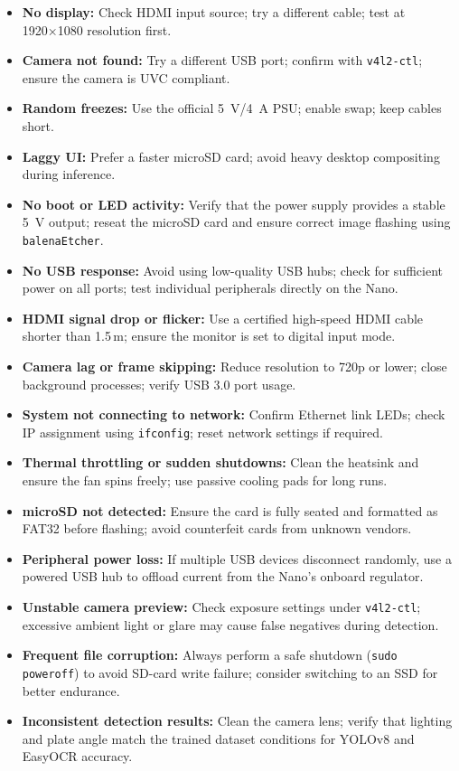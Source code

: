 \begin{itemize}
   \item \textbf{No display:} Check HDMI input source; try a different cable; test at 1920×1080 resolution first.
	\item \textbf{Camera not found:} Try a different USB port; confirm with \texttt{v4l2-ctl}; ensure the camera is UVC compliant.
	\item \textbf{Random freezes:} Use the official \SI{5}{\volt}/\SI{4}{\ampere} PSU; enable swap; keep cables short.
	\item \textbf{Laggy UI:} Prefer a faster microSD card; avoid heavy desktop compositing during inference.
	\item \textbf{No boot or LED activity:} Verify that the power supply provides a stable \SI{5}{\volt} output; reseat the microSD card and ensure correct image flashing using \texttt{balenaEtcher}.
	\item \textbf{No USB response:} Avoid using low-quality USB hubs; check for sufficient power on all ports; test individual peripherals directly on the Nano.
	\item \textbf{HDMI signal drop or flicker:} Use a certified high-speed HDMI cable shorter than 1.5\,m; ensure the monitor is set to digital input mode.
	\item \textbf{Camera lag or frame skipping:} Reduce resolution to 720p or lower; close background processes; verify USB 3.0 port usage.
	\item \textbf{System not connecting to network:} Confirm Ethernet link LEDs; check IP assignment using \texttt{ifconfig}; reset network settings if required.
	\item \textbf{Thermal throttling or sudden shutdowns:} Clean the heatsink and ensure the fan spins freely; use passive cooling pads for long runs.
	\item \textbf{microSD not detected:} Ensure the card is fully seated and formatted as FAT32 before flashing; avoid counterfeit cards from unknown vendors.  
	\item \textbf{Peripheral power loss:} If multiple USB devices disconnect randomly, use a powered USB hub to offload current from the Nano’s onboard regulator.  
	\item \textbf{Unstable camera preview:} Check exposure settings under \texttt{v4l2-ctl}; excessive ambient light or glare may cause false negatives during detection.  
	\item \textbf{Frequent file corruption:} Always perform a safe shutdown (\texttt{sudo poweroff}) to avoid SD-card write failure; consider switching to an SSD for better endurance.  
	\item \textbf{Inconsistent detection results:} Clean the camera lens; verify that lighting and plate angle match the trained dataset conditions for YOLOv8 and EasyOCR accuracy.  
\end{itemize}
